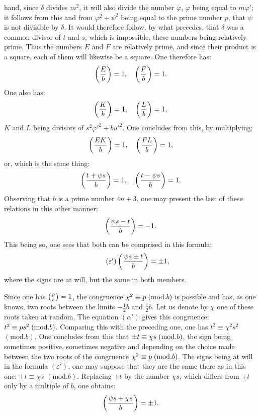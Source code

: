 \noindent
hand, since $\delta$ divides $m^2$, it will also divide the number $\varphi$, $\varphi$ being equal to $m\varphi'$;
it follows from this and from $\varphi^2+\psi^2$ being equal to the prime number $p$, that $\psi$ is not
divisible by $\delta$. It would therefore follow, by what precedes, that $\delta$ was a common divisor
of $t$ and $s$, which is impossible, these numbers being relatively
prime. Thus the numbers $E$ and $F$ are relatively prime, and since their product
is a square, each of them will likewise be a square. One therefore has:
\[
\left(\frac{E}{b}\right)=1,\quad\left(\frac{F}{b}\right)=1.
\]
One also has:
\[
\left(\frac{K}{b}\right)=1,\quad\left(\frac{L}{b}\right)=1,
\]
$K$ and $L$ being divisors of $s^2\varphi'^2+bu'^2$. One concludes from this, by multiplying:
\[
\left(\frac{EK}{b}\right)=1,\quad\left(\frac{FL}{b}\right)=1,
\]
or, which is the same thing:
\[
\left(\frac{t+\psi s}{b}\right)=1,\quad\left(\frac{t-\psi s}{b}\right)=1.
\]
Observing that $b$ is a prime number $4n+3$, one may present
the last of these relations in this other manner:
\[
\left(\frac{\psi s-t}{b}\right)=-1.
\]
This being so, one sees that both can be comprised in this formula:
\begin{equation*}\tag{$\varepsilon'$}
\left(\frac{\psi s\pm t}{b}\right)=\pm1,
\end{equation*}
where the signs are at will, but the same in both members.
\par\indent
Since one has $\left(\frac{p}{b}\right)=1$, the congruence $\chi^2\equiv p\;(\mathrm{mod}.b)$ is possible and
has, as one knows, two roots between the limits $-\frac12b$ and $\frac12b$. Let us denote by
$\chi$ one of these roots taken at random. The equation $(\alpha')$ gives this congruence:
$t^2\equiv ps^2\;(\mathrm{mod}.b)$. Comparing this with the preceding one, one has $t^2\equiv\chi^2s^2$
$(\mathrm{mod}.b)$. One concludes from this that $\pm t\equiv\chi s\;(\mathrm{mod}.b)$, the sign being sometimes positive,
sometimes negative and depending on the choice made between the two roots
of the congruence $\chi^2\equiv p\;(\mathrm{mod}.b)$. The signs being at will in the formula
$(\varepsilon')$, one may suppose that they are the same there as in this one: $\pm t\equiv\chi s$
$(\mathrm{mod}.b)$. Replacing $\pm t$ by the number $\chi s$, which differs from $\pm t$ only by a
multiple of $b$, one obtains:
\[
\left(\frac{\psi s+\chi s}{b}\right)=\pm1.
\]
